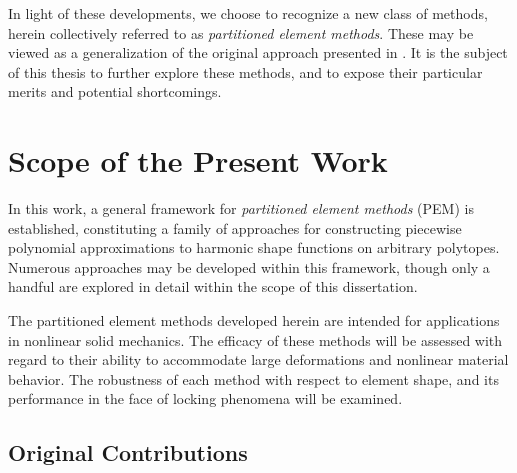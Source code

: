 	In light of these developments, we choose to recognize a new class of methods, herein collectively referred to as \textit{partitioned element methods}. These may be viewed as a generalization of the original approach presented in \cite{Rashid:12}. It is the subject of this thesis to further explore these methods, and to expose their particular merits and potential shortcomings.

\section{Scope of the Present Work}

	In this work, a general framework for \textit{partitioned element methods} (PEM) is established, constituting a family of approaches for constructing piecewise polynomial approximations to harmonic shape functions on arbitrary polytopes. Numerous approaches may be developed within this framework, though only a handful are explored in detail within the scope of this dissertation.
	
	 The partitioned element methods developed herein are intended for applications in nonlinear solid mechanics. The efficacy of these methods will be assessed with regard to their ability to accommodate large deformations and nonlinear material behavior. The robustness of each method with respect to element shape, and its performance in the face of locking phenomena will be examined.
	 
	 
\subsection*{Original Contributions}

